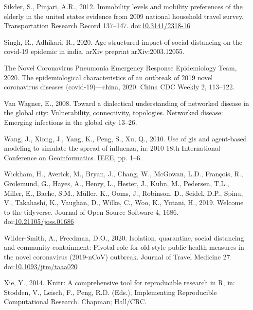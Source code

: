 \documentclass[]{elsarticle} %
\begin{document}
\leavevmode\hypertarget{ref-Sikder2012immobility}{}%
Sikder, S., Pinjari, A.R., 2012. Immobility levels and mobility
preferences of the elderly in the united states evidence from 2009
national household travel survey. Transportation Research Record
137--147. doi:\href{https://doi.org/10.3141/2318-16}{10.3141/2318-16}

\leavevmode\hypertarget{ref-Singh2020age}{}%
Singh, R., Adhikari, R., 2020. Age-structured impact of social
distancing on the covid-19 epidemic in india. arXiv preprint
arXiv:2003.12055.

\leavevmode\hypertarget{ref-Novel2020epidemiological}{}%
The Novel Coronavirus Pneumonia Emergency Response Epidemiology Team,
2020. The epidemiological characteristics of an outbreak of 2019 novel
coronavirus diseases (covid-19)---china, 2020. China CDC Weekly 2,
113--122.

\leavevmode\hypertarget{ref-vanWagner2008toward}{}%
Van Wagner, E., 2008. Toward a dialectical understanding of networked
disease in the global city: Vulnerability, connectivity, topologies.
Networked disease: Emerging infections in the global city 13--26.

\leavevmode\hypertarget{ref-Wang2010gis}{}%
Wang, J., Xiong, J., Yang, K., Peng, S., Xu, Q., 2010. Use of gis and
agent-based modeling to simulate the spread of influenza, in: 2010 18th
International Conference on Geoinformatics. IEEE, pp. 1--6.

\leavevmode\hypertarget{ref-Wickham2019}{}%
Wickham, H., Averick, M., Bryan, J., Chang, W., McGowan, L.D., François,
R., Grolemund, G., Hayes, A., Henry, L., Hester, J., Kuhn, M., Pedersen,
T.L., Miller, E., Bache, S.M., Müller, K., Ooms, J., Robinson, D.,
Seidel, D.P., Spinu, V., Takahashi, K., Vaughan, D., Wilke, C., Woo, K.,
Yutani, H., 2019. Welcome to the tidyverse. Journal of Open Source
Software 4, 1686.
doi:\href{https://doi.org/10.21105/joss.01686}{10.21105/joss.01686}

\leavevmode\hypertarget{ref-Wilder2020isolation}{}%
Wilder-Smith, A., Freedman, D.O., 2020. Isolation, quarantine, social
distancing and community containment: Pivotal role for old-style public
health measures in the novel coronavirus (2019-nCoV) outbreak. Journal
of Travel Medicine 27.
doi:\href{https://doi.org/10.1093/jtm/taaa020}{10.1093/jtm/taaa020}

\leavevmode\hypertarget{ref-Xie2014}{}%
Xie, Y., 2014. Knitr: A comprehensive tool for reproducible research in
R, in: Stodden, V., Leisch, F., Peng, R.D. (Eds.), Implementing
Reproducible Computational Research. Chapman; Hall/CRC.
\end{document}
